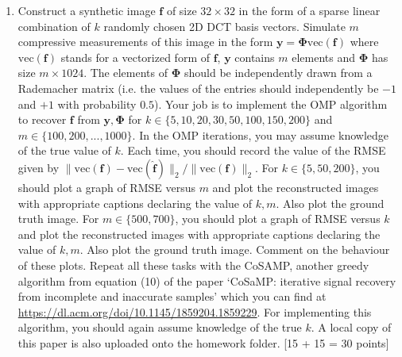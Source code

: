 \documentclass[11pt]{article}
\begin{document}
\begin{enumerate}
\item Construct a synthetic image $\boldsymbol{f}$ of size $32 \times 32$ in the form of a sparse linear combination of $k$ randomly chosen 2D DCT basis vectors. Simulate $m$ compressive measurements of this image in the form $\boldsymbol{y} = \boldsymbol{\Phi} \text{vec}(\boldsymbol{f})$ where $\text{vec}(\boldsymbol{f})$ stands for a vectorized form of $\boldsymbol{f}$, $\boldsymbol{y}$ contains $m$ elements and $\boldsymbol{\Phi}$ has size $m \times 1024$. The elements of $\boldsymbol{\Phi}$ should be independently drawn from a Rademacher matrix (i.e. the values of the entries should independently be $-1$ and $+1$ with probability $0.5$). Your job is to implement the OMP algorithm to recover $\boldsymbol{f}$ from $\boldsymbol{y}, \boldsymbol{\Phi}$ for $k \in \{5,10,20,30,50,100,150,200\}$ and $m \in \{100,200,...,1000\}$. In the OMP iterations, you may assume knowledge of the true value of $k$. Each time, you should record the value of the RMSE given by $\|\text{vec}(\boldsymbol{f}) - \text{vec}(\boldsymbol{\hat{f}})\|_2/\|\text{vec}(\boldsymbol{f})\|_2$. For $k \in \{5,50,200\}$, you should plot a graph of RMSE versus $m$ and plot the reconstructed images with appropriate captions declaring the value of $k,m$. Also plot the ground truth image. For $m \in \{500,700\}$, you should plot a graph of RMSE versus $k$ and plot the reconstructed images with appropriate captions declaring the value of $k,m$. Also plot the ground truth image. Comment on the behaviour of these plots. Repeat all these tasks with the CoSAMP, another greedy algorithm from equation (10) of the paper `CoSaMP: iterative signal recovery from incomplete and inaccurate samples' which you can find at \url{https://dl.acm.org/doi/10.1145/1859204.1859229}. For implementing this algorithm, you should again assume knowledge of the true $k$. A local copy of this paper is also uploaded onto the homework folder. \textsf{[15 + 15 = 30 points]}


\end{enumerate}
\end{document}
